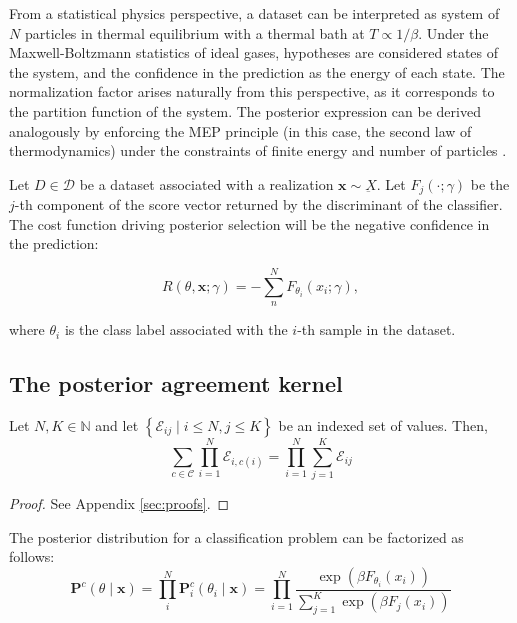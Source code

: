 From a statistical physics perspective, a dataset can be interpreted as system of 
$N$ particles in thermal equilibrium with a thermal bath at $T \propto 1/\beta$. 
Under the Maxwell-Boltzmann statistics of ideal gases, hypotheses are considered 
states of the system, and the confidence in the prediction as the energy of each state. 
The normalization factor arises naturally from this perspective, as it corresponds to 
the partition function of the system. The posterior expression can be derived analogously 
by enforcing the MEP principle (in this case, the second law of thermodynamics) under 
the constraints of finite energy and number of particles
\cite{bovierStatisticalMechanicsDisordered2012}.

\begin{definition}
    Let $D \in \mathcal{D}$ be a dataset associated with a realization $\bm{x} \sim \underbar{X}$. Let $F_j(\cdot; \gamma)$ 
    be the $j$-th component of the score vector returned by the discriminant of the classifier.
    The cost function driving posterior selection will be the negative
    confidence in the prediction:

    $$
    R(\theta, \bm{x}; \gamma) = - \sum_n^N F_{\theta_i}(x_i; \gamma),
    $$

    where $\theta_i$ is the class label associated with the $i$-th sample in the dataset.
\end{definition}

\subsection{The posterior agreement kernel}

\begin{lemma}[Exchangeability]\label{lemma:exchangeability} 
    Let $N, K \in \mathbb{N}$ and let $\left\{\mathcal{E}_{i j} \mid i \leq N, j \leq K\right\}$ be an indexed set of values. Then,
    $$
    \sum_{c \in \mathcal{C}} \prod_{i=1}^N \mathcal{E}_{i, c(i)}=\prod_{i=1}^N \sum_{j=1}^K \mathcal{E}_{i j}
    $$
\end{lemma}

\begin{proof}
    See Appendix \ref{sec:proofs}.
\end{proof}

\begin{theorem}\label{theorem:posterior_factorization}

    The posterior distribution for a classification problem can be factorized as follows:
    $$
    \mathbf{P}^c(\theta \mid \bm{x}) = \prod_i^N  \mathbf{P}_i^c(\theta_i \mid \bm{x}) = \prod_{i=1}^N \frac{\exp \left ( \beta F_{\theta_i}(x_i) \right )}{\sum_{j=1}^K \exp \left ( \beta F_j(x_i) \right )}
    $$
\end{theorem}

